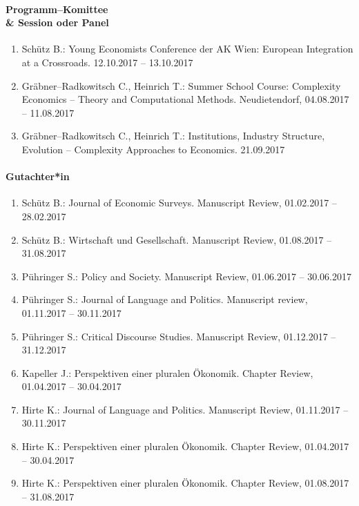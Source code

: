 \paragraph{Programm--Komittee \\\& Session oder Panel}
\begin{enumerate}[leftmargin=*, labelsep=0.5cm]
\item Schütz B.: Young Economists Conference der AK Wien: European Integration at a Crossroads. 12.10.2017 -- 13.10.2017
\item Gräbner--Radkowitsch C., Heinrich T.: Summer School Course: Complexity Economics -- Theory and Computational Methods. Neudietendorf, 04.08.2017 -- 11.08.2017
\item Gräbner--Radkowitsch C., Heinrich T.: Institutions, Industry Structure, Evolution -- Complexity Approaches to Economics. 21.09.2017
\end{enumerate}

\paragraph{Gutachter*in}
\begin{enumerate}[leftmargin=*, labelsep=0.5cm]
\item Schütz B.: Journal of Economic Surveys. Manuscript Review, 01.02.2017 -- 28.02.2017
\item Schütz B.: Wirtschaft und Gesellschaft. Manuscript Review, 01.08.2017 -- 31.08.2017
\item Pühringer S.: Policy and Society. Manuscript Review, 01.06.2017 -- 30.06.2017
\item Pühringer S.: Journal of Language and Politics. Manuscript review, 01.11.2017 -- 30.11.2017
\item Pühringer S.: Critical Discourse Studies. Manuscript Review, 01.12.2017 -- 31.12.2017
\item Kapeller J.: Perspektiven einer pluralen Ökonomik. Chapter Review, 01.04.2017 -- 30.04.2017
\item Hirte K.: Journal of Language and Politics. Manuscript Review, 01.11.2017 -- 30.11.2017
\item Hirte K.: Perspektiven einer pluralen Ökonomik. Chapter Review, 01.04.2017 -- 30.04.2017
\item Hirte K.: Perspektiven einer pluralen Ökonomik. Chapter Review, 01.08.2017 -- 31.08.2017
\end{enumerate}

